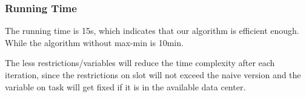 \begin{frame}
\frametitle{Running Time}
The running time is 15s, which indicates that our algorithm is efficient enough. While the algorithm without max-min is 10min.

The less restrictions/variables will reduce the time complexity after each iteration, since the restrictions on slot will not exceed the naive version and the variable on task will get fixed if it is in the available data center.
\end{frame}


% 